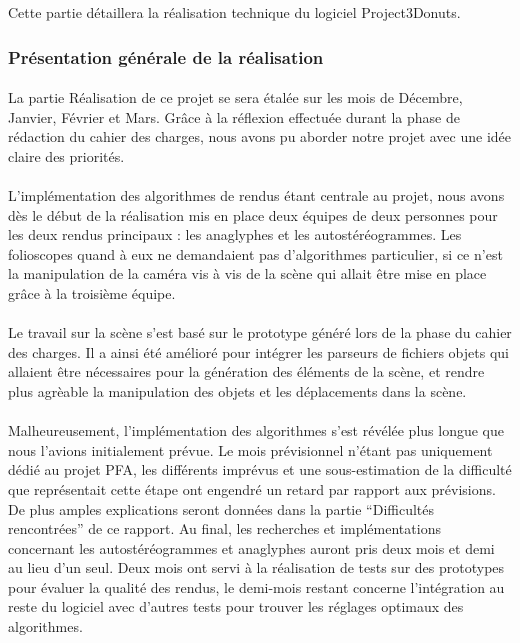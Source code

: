 Cette partie détaillera la réalisation technique du logiciel Project3Donuts.

\subsubsection{Présentation générale de la réalisation}
\paragraph{}
La partie Réalisation de ce projet se sera étalée sur les mois de Décembre, Janvier, Février et Mars. Grâce à la réflexion effectuée durant la phase de rédaction du cahier des charges, nous avons pu aborder notre projet avec une idée claire des priorités.

\paragraph{}
L'implémentation des algorithmes de rendus étant centrale au projet, nous avons dès le début de la réalisation mis en place deux équipes de deux personnes pour les deux rendus principaux : les anaglyphes et les autostéréogrammes. Les folioscopes quand à eux ne demandaient pas d'algorithmes particulier, si ce n'est la manipulation de la caméra vis à vis de la scène qui allait être mise en place grâce à la troisième équipe.

\paragraph{}
Le travail sur la scène s'est basé sur le prototype généré lors de la phase du cahier des charges. Il a ainsi été amélioré pour intégrer les parseurs de fichiers objets qui allaient être nécessaires pour la génération des éléments de la scène, et rendre plus agrèable la manipulation des objets et les déplacements dans la scène.

\paragraph{}
Malheureusement, l'implémentation des algorithmes s'est révélée plus longue que nous l'avions initialement prévue. Le mois prévisionnel n'étant pas uniquement dédié au projet PFA, les différents imprévus et une sous-estimation de la difficulté que représentait cette étape ont engendré un retard par rapport aux prévisions. De plus amples explications seront données dans la partie ``Difficultés rencontrées'' de ce rapport. 
Au final, les recherches et implémentations concernant les autostéréogrammes et anaglyphes auront pris deux mois et demi au lieu d'un seul. Deux mois ont servi à la réalisation de tests sur des prototypes pour évaluer la qualité des rendus, le demi-mois restant concerne l'intégration au reste du logiciel avec d'autres tests pour trouver les réglages optimaux des algorithmes.

